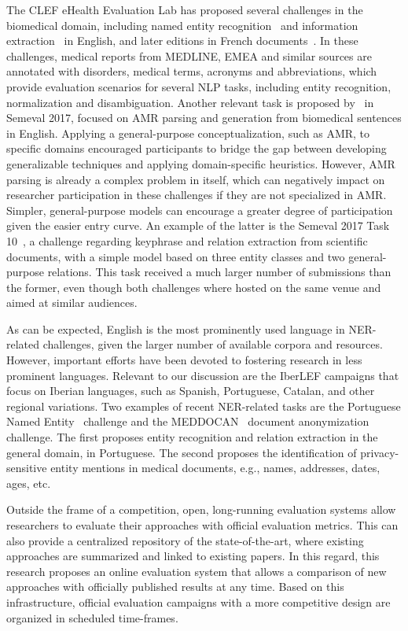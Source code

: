   The CLEF eHealth Evaluation Lab has proposed several challenges in the biomedical domain, including
  named entity recognition~\cite{clef2013} and information extraction~\cite{clef2014} in English,
  and later editions in French documents~\cite{clef2015, clef2016}.
  In these challenges, medical reports from MEDLINE, EMEA and similar sources are annotated with disorders, medical terms, acronyms and abbreviations, which provide evaluation scenarios
  for several NLP tasks, including entity recognition, normalization and disambiguation.
  Another relevant task is proposed by~\citet{semeval2017-task9} in Semeval 2017, focused on AMR parsing and generation from biomedical
  sentences in English. Applying a general-purpose conceptualization, such as AMR, to specific domains encouraged participants to bridge the gap between developing generalizable techniques and applying domain-specific heuristics.
  However, AMR parsing is already a complex problem in itself, which can negatively impact on researcher participation in these challenges if they are not specialized in AMR.
  Simpler, general-purpose models can encourage a greater degree of participation given the easier entry curve.
  An example of the latter is the Semeval 2017 Task 10~\cite{semeval2017-task10},
  a challenge regarding keyphrase and relation extraction from scientific documents,
  with a simple model based on three entity classes and two general-purpose relations.
  This task received a much larger number of submissions than the former, even though both challenges where hosted on the same venue and aimed at similar audiences.

  As can be expected, English is the most prominently used language in NER-related challenges, given the larger
  number of available corpora and resources. However, important efforts have been devoted to fostering research
  in less prominent languages. Relevant to our discussion are the IberLEF campaigns that focus on Iberian languages,
  such as Spanish, Portuguese, Catalan, and other regional variations.
  Two examples of recent NER-related tasks are the Portuguese Named Entity~\cite{glauber2019iberlef} challenge and the MEDDOCAN~\cite{marimon2019automatic} document anonymization challenge.
  The first proposes entity recognition and relation extraction in the general domain, in Portuguese.
  The second proposes the identification of privacy-sensitive entity mentions in medical documents, e.g., names, addresses,
  dates, ages, etc.

  Outside the frame of a competition, open, long-running evaluation systems allow
  researchers to evaluate their approaches with official evaluation metrics.
  This can also provide a centralized repository of the state-of-the-art, where existing approaches are
  summarized and linked to existing papers.
  In this regard, this research proposes an online evaluation system that allows a comparison of
  new approaches with officially published results at any time. Based on this infrastructure, official evaluation campaigns with a more competitive design are organized in scheduled time-frames.

